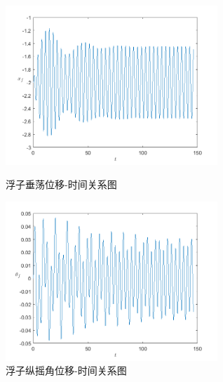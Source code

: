\documentclass{my_paper}
\begin{document}
\begin{figure}[!htbp]
    \centering
    \begin{minipage}[t]{0.48\textwidth}
    \centering
    \includegraphics[width=8cm]{3_xf.png}
    \caption{浮子垂荡位移-时间关系图}
    \label{fuzi chui}
    \end{minipage}
    \begin{minipage}[t]{0.48\textwidth}
    \centering
    \includegraphics[width=8cm]{3_thetaf.png}
    \caption{浮子纵摇角位移-时间关系图}
   \label{fuzi jiao}
    \end{minipage}
    \end{figure}
\end{document}
